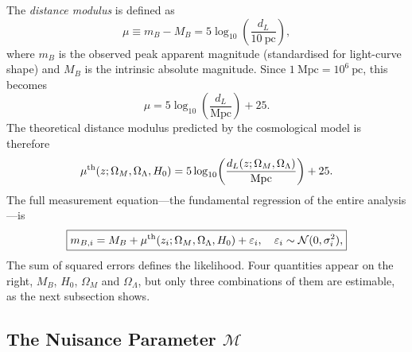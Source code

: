 \documentclass[12pt]{article}
\begin{document}
The \emph{distance modulus} is defined as
\begin{equation}\label{eq:mu_def}
  \mu \equiv m_B - M_B = 5\log_{10}\!\left(\frac{d_L}{10~\text{pc}}\right),
\end{equation}
where $m_B$ is the observed peak apparent magnitude (standardised for
light-curve shape) and $M_B$ is the intrinsic absolute magnitude.  Since
$1~\text{Mpc} = 10^6~\text{pc}$, this becomes
\begin{equation}\label{eq:mu_mpc}
  \mu = 5\log_{10}\!\left(\frac{d_L}{\text{Mpc}}\right) + 25.
\end{equation}
The theoretical distance modulus predicted by the cosmological model is
therefore
\begin{equation}\label{eq:mu_theory}
  \mu^{\rm th}(z;\Omega_M,\Omega_\Lambda,H_0) =
  5\log_{10}\!\left(\frac{d_L(z;\Omega_M,\Omega_\Lambda)}{\text{Mpc}}\right)
  + 25.
\end{equation}
The full measurement equation---the fundamental regression of the entire
analysis---is
\begin{equation}\label{eq:meas}
  \boxed{m_{B,i} = M_B + \mu^{\rm th}(z_i;\Omega_M,\Omega_\Lambda,H_0)
    + \varepsilon_i,
    \quad \varepsilon_i \sim \mathcal{N}(0,\sigma_i^2),}
\end{equation}
The sum of squared errors defines the likelihood.  Four quantities appear on
the right, $M_B$, $H_0$, $\Omega_M$ and $\Omega_\Lambda$, but only three
combinations of them are estimable, as the next subsection shows.

\subsection{The Nuisance Parameter $\mathcal{M}$}
\label{sec:mathcal_M}
\end{document}
